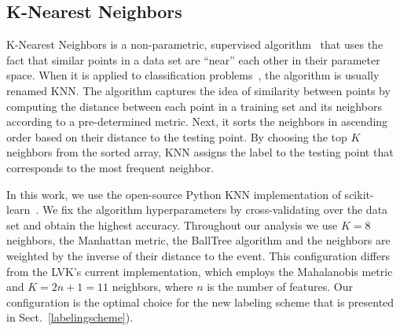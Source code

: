 \subsection*{K-Nearest Neighbors}

K-Nearest Neighbors is a non-parametric, supervised algorithm~\cite{Fix:1951,Cover:1967} that uses the fact that similar points in a data set are ``near'' each other in their parameter
space. When it is applied to classification problems~\cite{Guo:2004}, the algorithm is usually renamed \ac{KNN}. The algorithm captures the idea of similarity between points by computing
the distance between each point in a training set and its neighbors according to a pre-determined metric. Next, it sorts the neighbors in ascending order based on their distance to the
testing point. By choosing the top $K$ neighbors from the sorted array, \ac{KNN} assigns the label to the testing point that corresponds to the most frequent neighbor.

In this work, we use the open-source Python \ac{KNN} implementation of scikit-learn~\cite{Pedregosa:2011ork}. We fix the algorithm hyperparameters by cross-validating over the data set
and obtain the highest accuracy. Throughout our analysis we use $K = 8$ neighbors, the Manhattan metric, the BallTree algorithm and the neighbors are weighted by the inverse of their
distance to the event. This configuration differs from the \ac{LVK}'s current implementation, which employs the Mahalanobis metric and $K = 2n + 1 = 11$ neighbors, where $n$ is the number
of features. Our configuration is the optimal choice for the new labeling scheme that is presented in Sect.~\ref{labelingscheme}).


